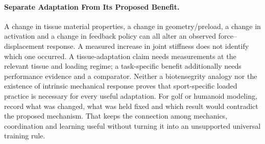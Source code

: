\paragraph{Separate Adaptation From Its Proposed Benefit.}
A change in tissue material properties, a change in geometry/preload, a change in activation and a change in feedback policy can all alter an observed force--displacement response.
A measured increase in joint stiffness does not identify which one occurred.
A tissue-adaptation claim needs measurements at the relevant tissue and loading regime; a task-specific benefit additionally needs performance evidence and a comparator.
Neither a biotensegrity analogy nor the existence of intrinsic mechanical response proves that sport-specific loaded practice is necessary for every useful adaptation.
For golf or humanoid modeling, record what was changed, what was held fixed and which result would contradict the proposed mechanism.
That keeps the connection among mechanics, coordination and learning useful without turning it into an unsupported universal training rule.
